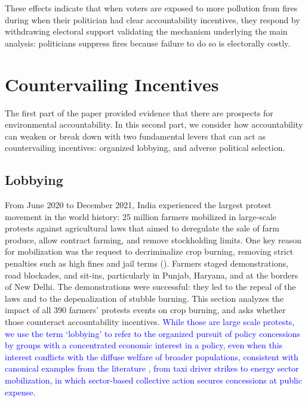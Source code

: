 \documentclass[12pt]{article}
\begin{document}
These effects indicate that when voters are exposed to more pollution from fires during when their politician had clear accountability incentives, they respond by withdrawing electoral support validating the mechanism underlying the main analysis: politicians suppress fires because failure to do so is electorally costly.

\section{Countervailing Incentives}

The first part of the paper provided evidence that there are prospects for environmental accountability. In this second part, we consider how accountability can weaken or break down with two fundamental levers that can act as countervailing incentives: organized lobbying, and adverse political selection.

 \subsection{Lobbying\label{ssec:lobbying}}
 
 From June 2020 to December 2021, India experienced the largest protest movement in the world history: 25 million farmers mobilized in large-scale protests against agricultural laws that aimed to deregulate the sale of farm produce, allow contract farming, and remove stockholding limits. One key reason for mobilization was the request to decriminalize crop burning, removing strict penalties such as high fines and jail terms (\citep{guardian2020farmers}). Farmers staged demonstrations, road blockades, and sit-ins, particularly in Punjab, Haryana, and at the borders of New Delhi. The demonstrations were successful: they led to the repeal of the laws and to the depenalization of stubble burning. This section analyzes the impact of all 390 farmers' protests events on crop burning, and asks whether those counteract accountability incentives. \textcolor{blue}{While those are large scale protests, we use the term `lobbying' to refer to the organized pursuit of policy concessions by groups with a concentrated economic interest in a policy, even when this interest conflicts with the diffuse welfare of broader populations, consistent with canonical examples from the literature \citep{olson1971logic}, from taxi driver strikes to energy sector mobilization, in which sector-based collective action secures concessions at public expense.}
\end{document}
